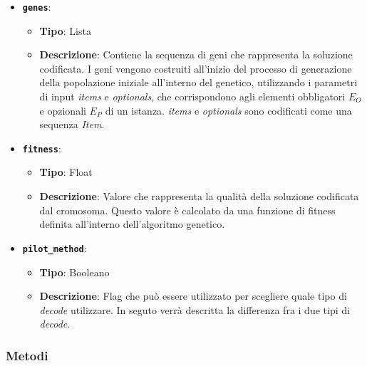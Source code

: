 \begin{itemize}
    \item \textbf{\texttt{genes}}:
    \begin{itemize}
        \item \textbf{Tipo}: Lista
        \item \textbf{Descrizione}: Contiene la sequenza di geni che rappresenta la soluzione codificata. I geni vengono costruiti all'inizio del processo di generazione della popolazione iniziale all'interno del genetico, utilizzando i parametri di input \emph{items} e \emph{optionals}, che corrispondono agli elementi obbligatori \( E_O \) e opzionali \( E_P \) di un istanza. \emph{items} e \emph{optionals} sono codificati come una sequenza \emph{Item}.
    \end{itemize}
    \item \textbf{\texttt{fitness}}:
    \begin{itemize}
        \item \textbf{Tipo}: Float
        \item \textbf{Descrizione}: Valore che rappresenta la qualità della soluzione codificata dal cromosoma. Questo valore è calcolato da una funzione di fitness definita all'interno dell'algoritmo genetico.
    \end{itemize}
    \item \textbf{\texttt{pilot\_method}}:
    \begin{itemize}
        \item \textbf{Tipo}: Booleano
        \item \textbf{Descrizione}: Flag che può essere utilizzato per scegliere quale tipo di \emph{decode} utilizzare. In seguto verrà descritta la differenza fra i due tipi di \emph{decode}.
    \end{itemize}
\end{itemize}

\subsubsection*{Metodi}

